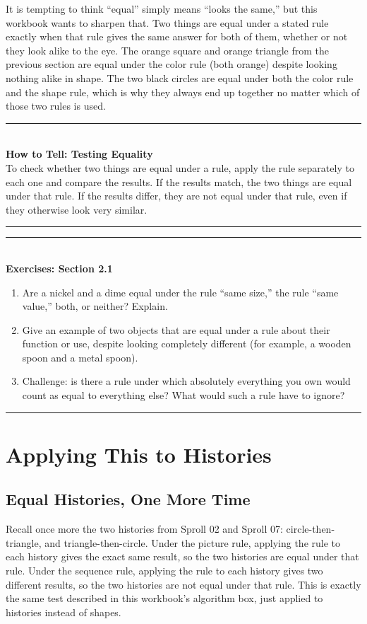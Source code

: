 \documentclass[11pt]{book}
\newenvironment{algorithmproc}[1]{\vspace{0.6em}\noindent\rule{\linewidth}{0.6pt}\\[0.2em]\textbf{How to Tell: #1}\\[0.3em]}{\\[0.2em]\noindent\rule{\linewidth}{0.6pt}\vspace{0.6em}}
\newenvironment{exercisebox}[1]{\vspace{0.8em}\noindent\rule{\linewidth}{0.6pt}\\[0.2em]\textbf{Exercises: #1}\\[0.3em]\begin{enumerate}[label=\arabic*., itemsep=0.4em]}{\end{enumerate}\noindent\rule{\linewidth}{0.6pt}\vspace{0.6em}}
\begin{document}
It is tempting to think ``equal'' simply means ``looks the same,'' but this workbook wants to sharpen that. Two things are equal under a stated rule exactly when that rule gives the same answer for both of them, whether or not they look alike to the eye. The orange square and orange triangle from the previous section are equal under the color rule (both orange) despite looking nothing alike in shape. The two black circles are equal under both the color rule and the shape rule, which is why they always end up together no matter which of those two rules is used.

\begin{algorithmproc}{Testing Equality}
To check whether two things are equal under a rule, apply the rule separately to each one and compare the results. If the results match, the two things are equal under that rule. If the results differ, they are not equal under that rule, even if they otherwise look very similar.
\end{algorithmproc}

\begin{exercisebox}{Section 2.1}
\item Are a nickel and a dime equal under the rule ``same size,'' the rule ``same value,'' both, or neither? Explain.
\item Give an example of two objects that are equal under a rule about their function or use, despite looking completely different (for example, a wooden spoon and a metal spoon).
\item Challenge: is there a rule under which absolutely everything you own would count as equal to everything else? What would such a rule have to ignore?
\end{exercisebox}

\chapter{Applying This to Histories}

\section{Equal Histories, One More Time}

Recall once more the two histories from Sproll 02 and Sproll 07: circle-then-triangle, and triangle-then-circle. Under the picture rule, applying the rule to each history gives the exact same result, so the two histories are equal under that rule. Under the sequence rule, applying the rule to each history gives two different results, so the two histories are not equal under that rule. This is exactly the same test described in this workbook's algorithm box, just applied to histories instead of shapes.
\end{document}
